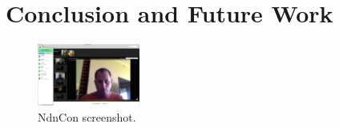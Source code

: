 \documentclass{icn/sig-alternate-2013} %
\newcommand{\ndnconName}{NdnCon}
\begin{document}
\section{Conclusion and Future Work}
\label{sec:conclusion}

\begin{figure}[t!]
\centering
\includegraphics[width=0.3\textwidth]{ndncon}
\caption{\ndnconName{} screenshot.}
\label{fig:ndncon}
\end{figure}

\end{document}
